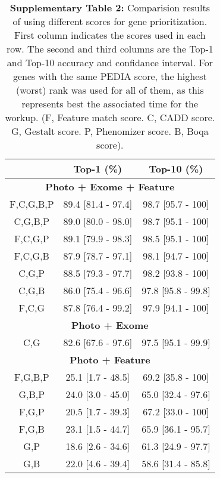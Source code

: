 \begin{center}
\begin{table}[ht]
\caption*{\textbf{Supplementary Table 2:} Comparision results of using
different scores for gene prioritization. First column indicates the
scores used in each row. The second and third columns are the Top-1 and
Top-10 accuracy and confidance interval. For genes with the same PEDIA
score, the highest (worst) rank was used for all of them, as this
represents best the associated time for the workup. (F, Feature match score. C, CADD score. G, Gestalt score. P, Phenomizer score. B, Boqa score).}\medskip
\label{result}
\centering
\begin{tabular}{|c|c|c|} \hline
&Top-1 (\%)&Top-10 (\%)\\ \hline 
\multicolumn{3}{|c|}{\textbf{Photo + Exome + Feature}}\\ \hline 
F,C,G,B,P&89.4 \small{[81.4 - 97.4]} & 98.7 \small{[95.7 - 100]}\\ \hline 
C,G,B,P&89.0 \small{[80.0 - 98.0]} & 98.7 \small{[95.1 - 100]}\\ \hline 
F,C,G,P&89.1 \small{[79.9 - 98.3]} & 98.5 \small{[95.1 - 100]}\\ \hline 
F,C,G,B&87.9 \small{[78.7 - 97.1]} & 98.1 \small{[94.7 - 100]}\\ \hline 
C,G,P&88.5 \small{[79.3 - 97.7]} & 98.2 \small{[93.8 - 100]}\\ \hline 
C,G,B&86.0 \small{[75.4 - 96.6]} & 97.8 \small{[95.8 - 99.8]}\\ \hline 
F,C,G&87.8 \small{[76.4 - 99.2]} & 97.9 \small{[94.1 - 100]}\\ \hline 
\multicolumn{3}{|c|}{\textbf{Photo + Exome}}\\ \hline 
C,G&82.6 \small{[67.6 - 97.6]} & 97.5 \small{[95.1 - 99.9]}\\ \hline 
\multicolumn{3}{|c|}{\textbf{Photo + Feature}}\\ \hline 
F,G,B,P&25.1 \small{[1.7 - 48.5]} & 69.2 \small{[35.8 - 100]}\\ \hline 
G,B,P&24.0 \small{[3.0 - 45.0]} & 65.0 \small{[32.4 - 97.6]}\\ \hline 
F,G,P&20.5 \small{[1.7 - 39.3]} & 67.2 \small{[33.0 - 100]}\\ \hline 
F,G,B&23.1 \small{[1.5 - 44.7]} & 65.9 \small{[36.1 - 95.7]}\\ \hline 
G,P&18.6 \small{[2.6 - 34.6]} & 61.3 \small{[24.9 - 97.7]}\\ \hline 
G,B&22.0 \small{[4.6 - 39.4]} & 58.6 \small{[31.4 - 85.8]}\\ \hline 

\end{tabular}
\end{table}
\end{center}
